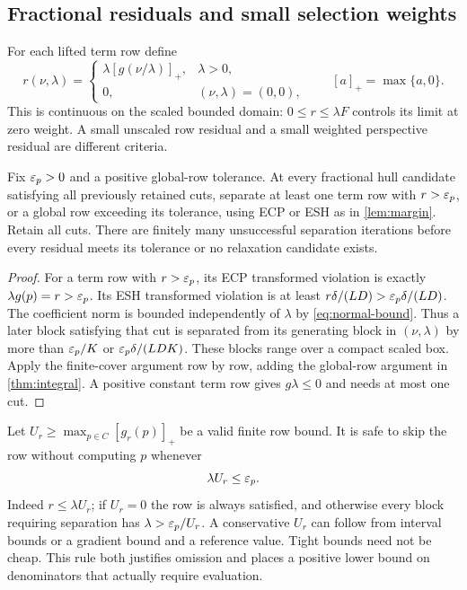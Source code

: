 \subsection{Fractional residuals and small selection weights}
For each lifted term row define
\begin{equation}\label{eq:weighted-residual}
 r(\nu,\lambda)=
 \begin{cases}
 \lambda[g(\nu/\lambda)]_+,&\lambda>0,\\
 0,&(\nu,\lambda)=(0,0),
 \end{cases}\qquad [a]_+=\max\{a,0\}.
\end{equation}
This is continuous on the scaled bounded domain: $0\le r\le\lambda F$ controls its limit at zero weight. A small unscaled row residual and a small weighted perspective residual are different criteria.

\begin{theorem}\label{thm:fractional}
Fix $\varepsilon_p>0$ and a positive global-row tolerance. At every fractional hull candidate satisfying all previously retained cuts, separate at least one term row with $r>\varepsilon_p$, or a global row exceeding its tolerance, using ECP or ESH as in \cref{lem:margin}. Retain all cuts. There are finitely many unsuccessful separation iterations before every residual meets its tolerance or no relaxation candidate exists.
\end{theorem}
\begin{proof}
For a term row with $r>\varepsilon_p$, its ECP transformed violation is exactly $\lambda g(p)=r>\varepsilon_p$. Its ESH transformed violation is at least $r\delta/(LD)>\varepsilon_p\delta/(LD)$. The coefficient norm is bounded independently of $\lambda$ by \eqref{eq:normal-bound}. Thus a later block satisfying that cut is separated from its generating block in $(\nu,\lambda)$ by more than $\varepsilon_p/K$ or $\varepsilon_p\delta/(LDK)$. These blocks range over a compact scaled box. Apply the finite-cover argument row by row, adding the global-row argument in \cref{thm:integral}. A positive constant term row gives $g\lambda\le0$ and needs at most one cut.
\end{proof}
Let $U_r\ge\max_{p\in C}[g_r(p)]_+$ be a valid finite row bound. It is safe to skip the row without computing $p$ whenever
\begin{equation}\label{eq:safe-skip}
 \lambda U_r\le\varepsilon_p.
\end{equation}
Indeed $r\le\lambda U_r$; if $U_r=0$ the row is always satisfied, and otherwise every block requiring separation has $\lambda>\varepsilon_p/U_r$. A conservative $U_r$ can follow from interval bounds or a gradient bound and a reference value. Tight bounds need not be cheap. This rule both justifies omission and places a positive lower bound on denominators that actually require evaluation.

